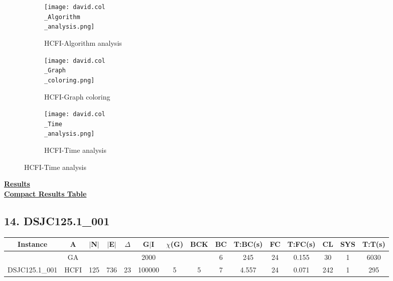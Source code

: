 \documentclass[10pt]{article}
\begin{document}
\graphicspath{{./Core1/Solutions/HCFI/david.col}}
\begin{figure}[H]
\begin{subfigure}{.33\textwidth}
  \centering
  \texttt{[image: david.col\\\_Algorithm\\\_analysis.png]}
  \caption{HCFI-Algorithm analysis}
   \label{fig:subfig1}
\end{subfigure}%
\begin{subfigure}{.33\textwidth}
  \centering
  \texttt{[image: david.col\\\_Graph\\\_coloring.png]}
  \caption{HCFI-Graph coloring}
  \label{fig:subfig2}
\end{subfigure}
\begin{subfigure}{.33\textwidth}
  \centering
  \texttt{[image: david.col\\\_Time\\\_analysis.png]}
  \caption{HCFI-Time analysis}
  \end{subfigure}
\end{figure}
\vspace{2cm}
\begin{center}
\hyperlink{page.8}{\textbf{Results}}\\
\vspace{0.5cm}
\hyperlink{page.71}{\textbf{Compact Results Table}}
\end{center}
\pagebreak
\subsection*{\hspace{0,9073976cm} 14. DSJC125.1\_001}
\begin{table}[H]
\centering
\begin{tabular}{|c|c|c|c|c|c|c|c|c|c|c|c|c|c|c|}
\hline
Instance& A &$|$N$|$ & $|$E$|$ & $\Delta$ & G$|$I & $\chi$(G) &BCK&BC & T:BC(s) & FC & T:FC(s) & CL & SYS & T:T(s) \\ \hline \hline

	&GA&       &                   &                     &2000         &     \cellcolor{yellow} & {\cellcolor{yellow}}& {{\cellcolor{green}6}}
&245   & 24       &0.155                   &30                    &1          &6030        \\ \cline{2-2} \cline{6-6} \cline{9-15}
 \multirow{-2}{*}{DSJC125.1\_001} &HCFI   &\multirow{-2}{*}{125}   &\multirow{-2}{*}{736}     &\multirow{-2}{*}{23}     &100000     &\multirow{-2}{*}{\cellcolor{yellow}5}      & \multirow{-2}{*}{\cellcolor{yellow}5}    &{\cellcolor{green}7}     &4.557         &24    &0.071         &242    &1     &295        \\ \hline
\end{tabular}
\end{table}
\end{document}
